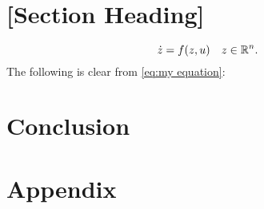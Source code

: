 \lipsum[7]

\section{[Section Heading]}

\lipsum[9]
\begin{equation}
    \label{eq:my equation}
    \dot z = f(z,u) \quad z \in \mathbb{R}^n.
\end{equation}
The following is clear from \cref{eq:my equation}:
\lipsum[10-11]

\section{Conclusion}
\label{sec:conclusion}
\lipsum[12]


\nocite{knuth:ct:a}
\nocite{glashow}
\nocite{aristotle:physics}
\nocite{moore}
\nocite{salam}
\nocite{ctan}
\nocite{loh}
\printbibliography

\appendix
\section{Appendix}
\label{sec:appendix}

\lipsum[1]